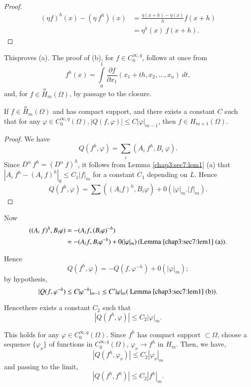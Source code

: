 \begin{proof}%
\begin{align*}
    (\eta f)^h (x) - (\eta ~ f^h) (x) &= \frac{\eta (x+h) - \eta
      (x)}{h} f(x+h)\\ 
    & = \eta^h (x) ~ f(x + h).
\end{align*}
\end{proof}

This\pageoriginale proves (a). The proof of (b), for $f \in C^{\infty, q}_0$,
follows at once from 
$$
f^h (x) = \int\limits_0^1 \frac{\partial f}{\partial x_1} (x_1 + th,
x_2, \ldots , x_n) ~ dt, 
$$
and, for $f \in \overset{o}{H}_m(\Omega )$, by passage to the closure.

\setcounter{proposition}{0}
\begin{proposition}\label{chap3:sec7:prop1}%
  If $f \in \overset{o}{H}_m (\Omega )$ and has compact support, and
  there exists a constant $C$ such that for any $\varphi \in
  C^{\infty, q}_0 (\Omega ), | Q (f, \varphi) | \leq C | \varphi
  |_{m-1}$, then $f \in H_{m+1}(\Omega )$.  
\end{proposition}

\begin{proof}%
  We have
  $$
  Q (f^h, \varphi ) = \sum_i (A_i ~ f^h, B_i ~ \varphi ).
  $$
  Since $D^\alpha ~ f^h = (D^\alpha ~ f)^h$, it follows from Lemma
  \ref{chap3:sec7:lem1} (a) that $| A_i ~ f^h - (A_i ~ f)^h |_0 \leq C_1 | f |_m$ for a
  constant $C_1$ depending on $L$. Hence 
  $$
  Q(f^h, \varphi) = \sum ((A_i f)^h, B_i  \varphi) + 0 (| \varphi |_m . |f |_m).
  $$
\end{proof}

Now 
\begin{align*}
  ((A_i ~ f)^h, B_i \varphi ) & = - (A_i f, (B_i \varphi)^{-h})\\
  & = - (A_i f, B_i \varphi^{-h}) + 0(| \varphi|_m)\, (\text{Lemma
    \ref{chap3:sec7:lem1} (a)}). 
\end{align*}

Hence 
$$
Q(f^h, \varphi) = - Q(f, \varphi^{-h}) + 0 ( | \varphi |_m);
$$
by hypothesis, 
$$
| Q (f, \varphi^{-h}) \leq C | \varphi^{-h} |_{m-1} \leq C' | \varphi
|_m (\text{ Lemma \ref{chap3:sec7:lem1} (b)}). 
$$

Hence\pageoriginale there exists a constant $C_2$ such that 
$$
| Q (f^h, \varphi) | \leq C_2 | \varphi |_m.
$$

This holds for any $\varphi \in C^{\infty,q}_0 (\Omega)$. Since $f^h$
has compact support $\subset \Omega$, choose a sequence $\{
\varphi_\nu\}$ of functions in $C^{\infty, q}_0 (\Omega )$,
$\varphi_\nu \rightarrow f^h$ in $H_m$. Then, we have, 
$$
| Q(f^h, \varphi_\nu) | \leq C_2 | \varphi_\nu |_m
$$
and passing to the limit,
\begin{equation}
  | Q (f^h, f^h) | \leq C_2 | f^h |_m. \tag{7.1}\label{chap3:sec7:eq7.1}
\end{equation}


